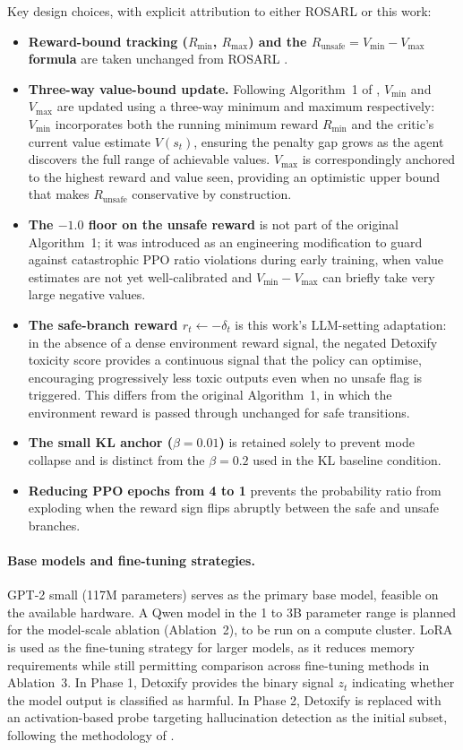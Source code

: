 \documentclass[a4paper,twoside,12pt]{report}
\newcommand{\runsafe}{R_{\text{unsafe}}}
\newcommand{\vmin}{V_{\min}}
\newcommand{\vmax}{V_{\max}}
\newcommand{\rmin}{R_{\min}}
\newcommand{\rmax}{R_{\max}}
\begin{document}
Key design choices, with explicit attribution to either ROSARL or this work:
\begin{itemize}
  \item \textbf{Reward-bound tracking ($\rmin$, $\rmax$) and the $\runsafe = \vmin - \vmax$ formula} are taken unchanged from ROSARL \citep{nanguetasse2026}.
  \item \textbf{Three-way value-bound update.} Following Algorithm~1 of
    \citet{nanguetasse2026}, $\vmin$ and $\vmax$ are updated using a three-way
    minimum and maximum respectively: $\vmin$ incorporates both the running minimum
    reward $\rmin$ and the critic's current value estimate $V(s_t)$, ensuring the
    penalty gap grows as the agent discovers the full range of achievable values.
    $\vmax$ is correspondingly anchored to the highest reward and value seen,
    providing an optimistic upper bound that makes $\runsafe$ conservative by
    construction.
  \item \textbf{The $-1.0$ floor on the unsafe reward} is not part of the original
    Algorithm~1; it was introduced as an engineering modification to guard against
    catastrophic PPO ratio violations during early training, when value estimates are
    not yet well-calibrated and $\vmin - \vmax$ can briefly take very large negative
    values.
  \item \textbf{The safe-branch reward $r_t \leftarrow -\delta_t$} is this work's
    LLM-setting adaptation: in the absence of a dense environment reward signal, the
    negated Detoxify toxicity score provides a continuous signal that the policy can
    optimise, encouraging progressively less toxic outputs even when no unsafe flag
    is triggered. This differs from the original Algorithm~1, in which the
    environment reward is passed through unchanged for safe transitions.
  \item \textbf{The small KL anchor ($\beta = 0.01$)} is retained solely to prevent
    mode collapse and is distinct from the $\beta = 0.2$ used in the KL baseline
    condition.
  \item \textbf{Reducing PPO epochs from 4 to 1} prevents the probability ratio from
    exploding when the reward sign flips abruptly between the safe and unsafe branches.
\end{itemize}

\paragraph{Base models and fine-tuning strategies.}
GPT-2 small (117M parameters) serves as the primary base model, feasible on the
available hardware. A Qwen model in the 1 to 3B parameter range is planned for the
model-scale ablation (Ablation~2), to be run on a compute cluster. LoRA
\citep{hu2022lora} is used as the fine-tuning strategy for larger models, as it reduces
memory requirements while still permitting comparison across fine-tuning methods in
Ablation~3. In Phase 1, Detoxify \citep{hanu2020detoxify} provides the binary signal
$z_t$ indicating whether the model output is classified as harmful. In Phase 2, Detoxify
is replaced with an activation-based probe targeting hallucination detection as the
initial subset, following the methodology of \citet{rateike2023}.
\end{document}
